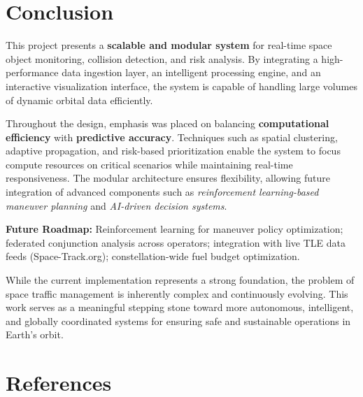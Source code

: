 \documentclass[11pt, a4paper]{article}
\newcommand{\keyword}[1]{\textcolor{orbitcyan}{\textbf{#1}}}
\begin{document}
\section{Conclusion}

This project presents a \keyword{scalable and modular system} for real-time space object monitoring,
collision detection, and risk analysis. By integrating a high-performance data ingestion layer, an
intelligent processing engine, and an interactive visualization interface, the system is capable of
handling large volumes of dynamic orbital data efficiently.

Throughout the design, emphasis was placed on balancing \textbf{computational efficiency} with
\textbf{predictive accuracy}. Techniques such as spatial clustering, adaptive propagation, and
risk-based prioritization enable the system to focus compute resources on critical scenarios while
maintaining real-time responsiveness. The modular architecture ensures flexibility, allowing future
integration of advanced components such as \textit{reinforcement learning-based maneuver planning}
and \textit{AI-driven decision systems}.

\begin{infobox}
\textbf{Future Roadmap:} Reinforcement learning for maneuver policy optimization; federated
conjunction analysis across operators; integration with live TLE data feeds (Space-Track.org);
constellation-wide fuel budget optimization.
\end{infobox}

While the current implementation represents a strong foundation, the problem of space traffic
management is inherently complex and continuously evolving. This work serves as a meaningful
stepping stone toward more autonomous, intelligent, and globally coordinated systems for ensuring
safe and sustainable operations in Earth's orbit.

\newpage
\section*{References}
\end{document}
